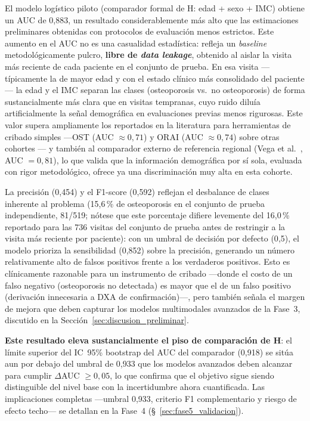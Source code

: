 \documentclass[../tesis.tex]{subfiles}
\begin{document}
El modelo logístico piloto (comparador formal de H: edad + sexo + IMC) obtiene un AUC de 0{,}883, un resultado considerablemente más alto que las estimaciones preliminares obtenidas con protocolos de evaluación menos estrictos. Este aumento en el AUC no es una casualidad estadística: refleja un \textit{baseline} metodológicamente pulcro, \textbf{libre de \textit{data leakage}}, obtenido al aislar la visita más reciente de cada paciente en el conjunto de prueba. En esa visita ---típicamente la de mayor edad y con el estado clínico más consolidado del paciente--- la edad y el IMC separan las clases (osteoporosis vs.\ no osteoporosis) de forma sustancialmente más clara que en visitas tempranas, cuyo ruido diluía artificialmente la señal demográfica en evaluaciones previas menos rigurosas. Este valor supera ampliamente los reportados en la literatura para herramientas de cribado simples ---OST (AUC $\approx 0{,}71$) y ORAI (AUC $\approx 0{,}74$) sobre otras cohortes \cite{Je2025}--- y también al comparador externo de referencia regional (Vega et al.\ \parencite{Vega2024}, AUC $= 0{,}81$), lo que valida que la información demográfica por sí sola, evaluada con rigor metodológico, ofrece ya una discriminación muy alta en esta cohorte.

La precisión (0{,}454) y el F1-score (0{,}592) reflejan el desbalance de clases inherente al problema (15{,}6\,\% de osteoporosis en el conjunto de prueba independiente, 81/519; nótese que este porcentaje difiere levemente del 16{,}0\,\% reportado para las 736 visitas del conjunto de prueba antes de restringir a la visita más reciente por paciente): con un umbral de decisión por defecto (0{,}5), el modelo prioriza la sensibilidad (0{,}852) sobre la precisión, generando un número relativamente alto de falsos positivos frente a los verdaderos positivos. Esto es clínicamente razonable para un instrumento de cribado ---donde el costo de un falso negativo (osteoporosis no detectada) es mayor que el de un falso positivo (derivación innecesaria a DXA de confirmación)---, pero también señala el margen de mejora que deben capturar los modelos multimodales avanzados de la Fase~3, discutido en la Sección~\ref{sec:discusion_preliminar}.

\textbf{Este resultado eleva sustancialmente el piso de comparación de H}: el límite superior del IC~95\% bootstrap del AUC del comparador (0{,}918) se sitúa aun por debajo del umbral de 0{,}933 que los modelos avanzados deben alcanzar para cumplir $\Delta$AUC $\geq 0{,}05$, lo que confirma que el objetivo sigue siendo distinguible del nivel base con la incertidumbre ahora cuantificada. Las implicaciones completas ---umbral 0{,}933, criterio F1 complementario y riesgo de efecto techo--- se detallan en la Fase~4 (§~\ref{sec:fase5_validacion}).
\end{document}
